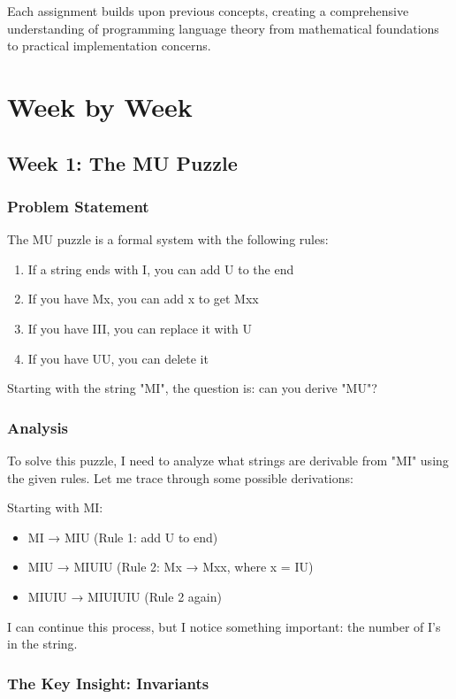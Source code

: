 \documentclass{article}
\theoremstyle{plain}
\theoremstyle{definition}
\theoremstyle{remark}
\begin{document}
Each assignment builds upon previous concepts, creating a comprehensive understanding of programming language theory from mathematical foundations to practical implementation concerns.

\section{Week by Week}\label{homework}

\subsection{Week 1: The MU Puzzle}

\subsubsection{Problem Statement}

The MU puzzle is a formal system with the following rules:
\begin{enumerate}
\item If a string ends with I, you can add U to the end
\item If you have Mx, you can add x to get Mxx
\item If you have III, you can replace it with U
\item If you have UU, you can delete it
\end{enumerate}

Starting with the string "MI", the question is: can you derive "MU"?

\subsubsection{Analysis}

To solve this puzzle, I need to analyze what strings are derivable from "MI" using the given rules. Let me trace through some possible derivations:

Starting with MI:
\begin{itemize}
\item MI → MIU (Rule 1: add U to end)
\item MIU → MIUIU (Rule 2: Mx → Mxx, where x = IU)
\item MIUIU → MIUIUIU (Rule 2 again)
\end{itemize}

I can continue this process, but I notice something important: the number of I's in the string.

\subsubsection{The Key Insight: Invariants}
\end{document}
